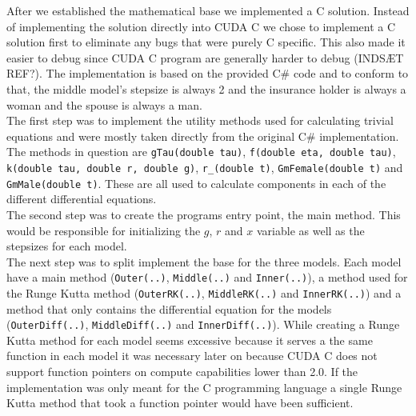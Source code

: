 
After we established the mathematical base we implemented a C solution. Instead of implementing the solution directly into CUDA C we chose to implement a C solution first to eliminate any bugs that were purely C specific. This also made it easier to debug since CUDA C program are generally harder to debug (INDSÆT REF?). The implementation is based on the provided C\# code and to conform to that, the middle model's stepsize is always 2 and the insurance holder is always a woman and the spouse is always a man. \\

The first step was to implement the utility methods used for calculating trivial equations and were mostly taken directly from the original C\# implementation. The methods in question are \texttt{gTau(double tau)}, \texttt{f(double eta, double tau)}, \texttt{k(double tau, double r, double g)}, \texttt{r\_(double t)}, \texttt{GmFemale(double t)} and \texttt{GmMale(double t)}. These are all used to calculate components in each of the different differential equations. \\

The second step was to create the programs entry point, the main method. This would be responsible for initializing the $g$, $r$ and $x$ variable as well as the stepsizes for each model. \\

The next step was to split implement the base for the three models. Each model have a main method (\texttt{Outer(..)}, \texttt{Middle(..)} and \texttt{Inner(..)}), a method used for the Runge Kutta method (\texttt{OuterRK(..)}, \texttt{MiddleRK(..)} and \texttt{InnerRK(..)}) and a method that only contains the differential equation for the models (\texttt{OuterDiff(..)}, \texttt{MiddleDiff(..)} and \texttt{InnerDiff(..)}). While creating a Runge Kutta method for each model seems excessive because it serves a the same function in each model it was necessary later on because CUDA C does not support function pointers on compute capabilities lower than 2.0. If the implementation was only meant for the C programming language a single Runge Kutta method that took a function pointer would have been sufficient. \\

